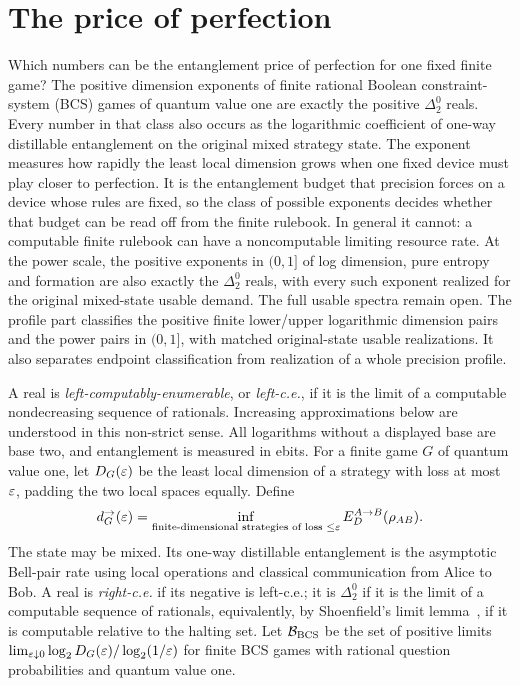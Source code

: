 \section{The price of perfection}\label{sec:intro}
Which numbers can be the entanglement price of perfection for one fixed finite game? The positive dimension exponents of finite rational Boolean constraint-system (BCS) games of quantum value one are exactly the positive $\Delta^0_2$ reals. Every number in that class also occurs as the logarithmic coefficient of one-way distillable entanglement on the original mixed strategy state. The exponent measures how rapidly the least local dimension grows when one fixed device must play closer to perfection. It is the entanglement budget that precision forces on a device whose rules are fixed, so the class of possible exponents decides whether that budget can be read off from the finite rulebook. In general it cannot: a computable finite rulebook can have a noncomputable limiting resource rate. At the power scale, the positive exponents in $(0,1]$ of log dimension, pure entropy and formation are also exactly the $\Delta^0_2$ reals, with every such exponent realized for the original mixed-state usable demand. The full usable spectra remain open. The profile part classifies the positive finite lower/upper logarithmic dimension pairs and the power pairs in $(0,1]$, with matched original-state usable realizations. It also separates endpoint classification from realization of a whole precision profile.

A real is \emph{left-computably-enumerable}, or \emph{left-c.e.}, if it is the limit of a computable nondecreasing sequence of rationals. Increasing approximations below are understood in this non-strict sense. All logarithms without a displayed base are base two, and entanglement is measured in ebits. For a finite game $G$ of quantum value one, let $D_G(\varepsilon)$ be the least local dimension of a strategy with loss at most $\varepsilon$, padding the two local spaces equally. Define
\begin{equation}\label{eq:usable-definition}
 d^\to_G(\varepsilon)=\inf_{\text{finite-dimensional strategies of loss }\le\varepsilon}
 E_D^{A\to B}(\rho_{AB}).
\end{equation}
The state may be mixed. Its one-way distillable entanglement is the asymptotic Bell-pair rate using local operations and classical communication from Alice to Bob. A real is \emph{right-c.e.} if its negative is left-c.e.; it is $\Delta^0_2$ if it is the limit of a computable sequence of rationals, equivalently, by Shoenfield's limit lemma~\cite{Sho59}, if it is computable relative to the halting set. Let $\mathcal B_{\rm BCS}$ be the set of positive limits $\lim_{\varepsilon\downarrow0}\log_2D_G(\varepsilon)/\log_2(1/\varepsilon)$ for finite BCS games with rational question probabilities and quantum value one.

